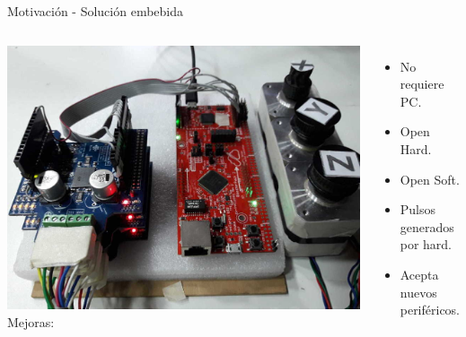\documentclass[aspectratio= 43]{beamer}
\begin{document}
\begin{frame}{Motivación - Solución embebida}
   \begin{columns}
         \includegraphics[width=\textwidth]{./Figures/prototipo_hardware4.jpg}
      Mejoras:
      \begin{itemize}
               \item{No requiere PC.}
               \item{Open Hard.}
               \item{Open Soft.}
               \item{Pulsos generados por hard.}
               \item{Acepta nuevos periféricos.}
      \end{itemize}
   \end{columns}
\end{frame}
\end{document}
